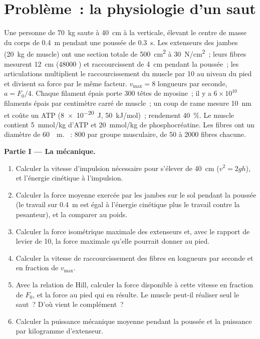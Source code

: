 \section{Problème~: la physiologie d'un saut}

\begin{problem}
\label{pb:b2:muscle-movement:1}
Une personne de \qty{70}{kg} saute à \qty{40}{cm} à la verticale,
élevant le centre de masse du corps de \qty{0.4}{m} pendant une poussée
de \qty{0.3}{s}. Les extenseurs des jambes (\qty{20}{kg} de muscle) ont
une section totale de \qty{500}{cm^2} à \qty{30}{N/cm^2}~; leurs fibres
mesurent \qty{12}{cm} (\num{48000} ) et raccourcissent de
\qty{4}{cm} pendant la poussée~; les articulations multiplient le
raccourcissement du muscle par \num{10} au niveau du pied et divisent sa
force par le même facteur. $v_{\max} = 8$ longueurs par seconde, $a = F_0/4$. Chaque
filament épais porte \num{300} têtes de myosine~; il y a $6\times
10^{10}$ filaments épais par centimètre carré de muscle~; un coup de rame
mesure \qty{10}{nm} et coûte un ATP (\qty{8e-20}{J}, \qty{50}{kJ/mol})~;
rendement \qty{40}{\%}. Le muscle contient \qty{5}{mmol/kg} d'ATP et
\qty{20}{mmol/kg} de phosphocréatine. Les fibres ont un diamètre de \qty{60}{\micro
m}. ~: \num{800} par groupe musculaire, de \num{50} à
\num{2000} fibres chacune.

\medskip
\noindent\textbf{Partie I --- La mécanique.}
\begin{enumerate}
  \item Calculer la vitesse d'impulsion nécessaire pour s'élever de
        \qty{40}{cm} ($v^{2} = 2gh$), et l'énergie cinétique à
        l'impulsion.
  \item Calculer la force moyenne exercée par les jambes sur le sol
        pendant la poussée (le travail sur \qty{0.4}{m} est égal à
        l'énergie cinétique plus le travail contre la pesanteur), et la
        comparer au poids.
  \item Calculer la force isométrique maximale des extenseurs et, avec
        le rapport de levier de 10, la force maximale qu'elle pourrait
        donner au pied.
  \item Calculer la vitesse de raccourcissement des fibres en longueurs
        par seconde et en fraction de $v_{\max}$.
  \item Avec la relation de Hill, calculer la force disponible à cette
        vitesse en fraction de $F_0$, et la force au pied qui en résulte.
        Le muscle peut-il réaliser seul le saut~? D'où vient le
        complément~?
  \item Calculer la puissance mécanique moyenne pendant la poussée et la
        puissance par kilogramme d'extenseur.
\end{enumerate}


\end{problem}
